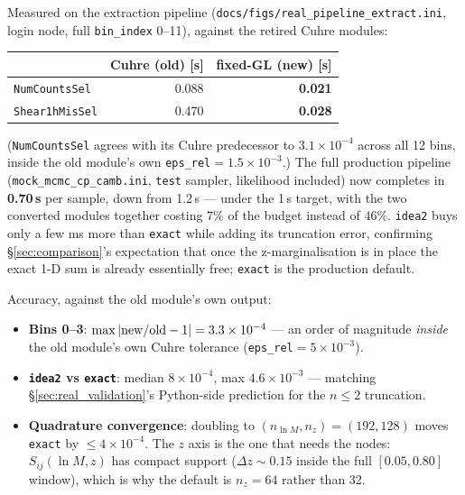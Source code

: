 \documentclass[a4paper, 11pt]{article}
\newcommand{\lnM}{\ln M}
\newcommand{\pyfile}[1]{{\small\texttt{#1}}}
\begin{document}
Measured on the extraction pipeline
(\pyfile{docs/figs/real\_pipeline\_extract.ini}, login node, full
\texttt{bin\_index} 0--11), against the retired Cuhre modules:
\begin{center}
\small
\begin{tabular}{l r r}
\toprule
 & Cuhre (old) [s] & fixed-GL (new) [s] \\
\midrule
\texttt{NumCountsSel}   & 0.088 & \textbf{0.021} \\
\texttt{Shear1hMisSel}  & 0.470 & \textbf{0.028} \\
\bottomrule
\end{tabular}
\end{center}
(\texttt{NumCountsSel} agrees with its Cuhre predecessor to
$3.1\times10^{-4}$ across all 12 bins, inside the old module's own
\texttt{eps\_rel}$=1.5\times10^{-3}$.) The full production pipeline
(\texttt{mock\_mcmc\_cp\_camb.ini}, \texttt{test} sampler, likelihood
included) now completes in \textbf{0.70\,s} per sample, down from
1.2\,s --- under the 1\,s target, with the two converted modules
together costing $7\%$ of the budget instead of $46\%$. \texttt{idea2}
buys only a few ms more than \texttt{exact} while adding its
truncation error, confirming \S\ref{sec:comparison}'s expectation that
once the z-marginalisation is in place the exact 1-D sum is already
essentially free; \texttt{exact} is the production default.

Accuracy, against the old module's own output:
\begin{itemize}
\item \textbf{Bins 0--3}: $\max|{\rm new}/{\rm old}-1| = 3.3\times10^{-4}$
  --- an order of magnitude \emph{inside} the old module's own Cuhre
  tolerance (\texttt{eps\_rel}$=5\times10^{-3}$).
\item \textbf{\texttt{idea2} vs \texttt{exact}}: median
  $8\times10^{-4}$, max $4.6\times10^{-3}$ --- matching
  \S\ref{sec:real_validation}'s Python-side prediction for the $n\le2$
  truncation.
\item \textbf{Quadrature convergence}: doubling to
  $(n_{\lnM},n_z)=(192,128)$ moves \texttt{exact} by
  $\le4\times10^{-4}$. The $z$ axis is the one that needs the nodes:
  $S_{ij}(\lnM,z)$ has compact support ($\Delta z\sim0.15$ inside the
  full $[0.05,0.80]$ window), which is why the default is $n_z=64$
  rather than 32.
\end{itemize}
\end{document}
